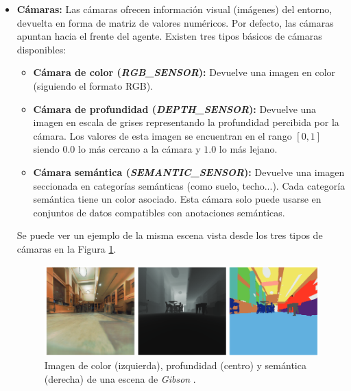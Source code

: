 \begin{itemize}
	\item \textbf{Cámaras:} Las cámaras ofrecen información visual (imágenes) del entorno, devuelta en forma de matriz de valores numéricos. Por defecto, las cámaras apuntan hacia el frente del agente. Existen tres tipos básicos de cámaras disponibles:
	\begin{itemize}
		\item \textbf{Cámara de color (\textit{RGB{\_}SENSOR}):} Devuelve una imagen en color (siguiendo el formato RGB).
		\item \textbf{Cámara de profundidad (\textit{DEPTH{\_}SENSOR}):} Devuelve una imagen en escala de grises representando la profundidad percibida por la cámara. Los valores de esta imagen se encuentran en el rango $[0, 1]$ siendo $0.0$ lo más cercano a la cámara y $1.0$ lo más lejano.
		\item \textbf{Cámara semántica (\textit{SEMANTIC{\_}SENSOR}):} Devuelve una imagen seccionada en categorías semánticas (como suelo, techo...). Cada categoría semántica tiene un color asociado. Esta cámara solo puede usarse en conjuntos de datos compatibles con anotaciones semánticas. 
	\end{itemize}
	
	Se puede ver un ejemplo de la misma escena vista desde los tres tipos de cámaras en la Figura \ref{fig:chap4-cameras}.
	
	\begin{figure}[h]
    \centering
    \includegraphics[width=\textwidth]{imagenes/cap4/cameras.png}
    \caption{Imagen de color (izquierda), profundidad (centro) y semántica (derecha) de una escena de \textit{Gibson} \cite{xiazamirhe2018gibsonenv}.}
    \label{fig:chap4-cameras}
\end{figure}		


\end{itemize}
